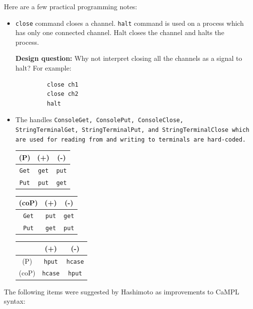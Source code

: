 \documentclass[11pt]{article}
\begin{document}
Here are a few practical programming notes:
\begin{itemize}
	\item {\tt close} command closes a channel. {\tt halt} command is used on a process which has only one connected channel. Halt closes the channel and halts the process. 
	
	{\bf Design question:} Why not interpret closing all the channels as a signal to halt? For example: 
	\begin{verbatim}
		 close ch1  
		 close ch2  
		 halt
	\end{verbatim}
	
	\item The handles \tt{ConsoleGet}, \tt{ConsolePut}, \tt{ConsoleClose}, \tt{StringTerminalGet}, \tt{StringTerminalPut}, and \tt{StringTerminalClose} which are used for reading from and writing to terminals are hard-coded.  
	
\begin{center}
	\begin{tabular}{ c | c | c }
		     (P)       & (+) & (-) \\
		 \hline      
		 {\tt Get}  & {\tt get}  & {\tt put} \\
		 \hline
		 {\tt Put}  & {\tt put}  & {\tt get} 
	\end{tabular}
	\quad \quad 
	\begin{tabular}{ c | c | c }
		     (coP)       & (+) & (-) \\
		 \hline      
		 {\tt Get}  & {\tt put}  & {\tt get} \\
		 \hline
		 {\tt Put}  & {\tt get}  & {\tt put} 
	\end{tabular}
	\quad \quad 
	\begin{tabular}{ c | c | c }
		            & (+) & (-) \\
		 \hline      
		 (P)  & {\tt hput}  & {\tt hcase} \\
		 \hline
		 (coP)  & {\tt hcase}  & {\tt hput} 
	\end{tabular}
\end{center}
 
\end{itemize}

The following items were suggested by Hashimoto as improvements to CaMPL syntax:
\end{document}
